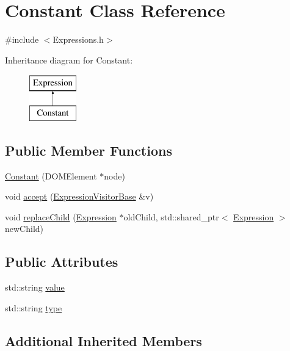 \hypertarget{class_constant}{\section{Constant Class Reference}
\label{class_constant}
}


{\ttfamily \#include $<$Expressions.\+h$>$}

Inheritance diagram for Constant\+:\begin{figure}[H]
\begin{center}
\leavevmode
\includegraphics[height=2.000000cm]{class_constant}
\end{center}
\end{figure}
\subsection*{Public Member Functions}
\begin{DoxyCompactItemize}
\item 
\hyperlink{class_constant_a23cf0950dbddde0872f58ad5a501ff3a}{Constant} (D\+O\+M\+Element $\ast$node)
\item 
void \hyperlink{class_constant_ae30bbf2455dd5d616291e106749ec1ae}{accept} (\hyperlink{class_expression_visitor_base}{Expression\+Visitor\+Base} \&v)
\item 
void \hyperlink{class_constant_acb214c5b00f30970ad525eb6b2f3e04d}{replace\+Child} (\hyperlink{class_expression}{Expression} $\ast$old\+Child, std\+::shared\+\_\+ptr$<$ \hyperlink{class_expression}{Expression} $>$ new\+Child)
\end{DoxyCompactItemize}
\subsection*{Public Attributes}
\begin{DoxyCompactItemize}
\item 
std\+::string \hyperlink{class_constant_a97bcf14e26810def51c57ae446d69e06}{value}
\item 
std\+::string \hyperlink{class_constant_aa730d17869971537ca16ffd658b9d4e0}{type}
\end{DoxyCompactItemize}
\subsection*{Additional Inherited Members}


